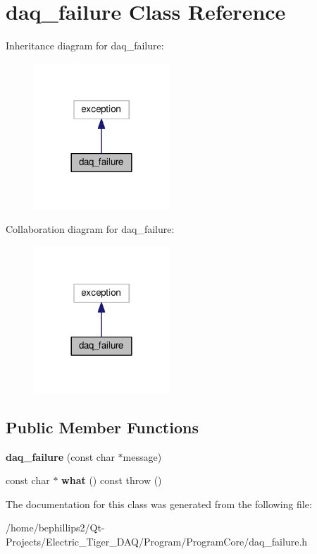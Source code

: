 \hypertarget{classdaq__failure}{}\section{daq\+\_\+failure Class Reference}
\label{classdaq__failure}


Inheritance diagram for daq\+\_\+failure\+:
\nopagebreak
\begin{figure}[H]
\begin{center}
\leavevmode
\includegraphics[width=144pt]{classdaq__failure__inherit__graph}
\end{center}
\end{figure}


Collaboration diagram for daq\+\_\+failure\+:
\nopagebreak
\begin{figure}[H]
\begin{center}
\leavevmode
\includegraphics[width=144pt]{classdaq__failure__coll__graph}
\end{center}
\end{figure}
\subsection*{Public Member Functions}
\begin{DoxyCompactItemize}
\item 
{\bfseries daq\+\_\+failure} (const char $\ast$message)\hypertarget{classdaq__failure_a09be8e49304de7788443555b533c6d1f}{}\label{classdaq__failure_a09be8e49304de7788443555b533c6d1f}

\item 
const char $\ast$ {\bfseries what} () const   throw ()\hypertarget{classdaq__failure_a9a83a2bd11cfce8bbc1cf85136459d35}{}\label{classdaq__failure_a9a83a2bd11cfce8bbc1cf85136459d35}

\end{DoxyCompactItemize}


The documentation for this class was generated from the following file\+:\begin{DoxyCompactItemize}
\item 
/home/bephillips2/\+Qt-\/\+Projects/\+Electric\+\_\+\+Tiger\+\_\+\+D\+A\+Q/\+Program/\+Program\+Core/daq\+\_\+failure.\+h\end{DoxyCompactItemize}
